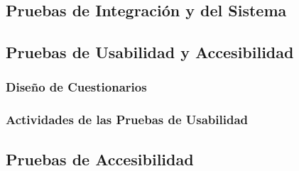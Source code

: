 \subsection{Pruebas de Integración y del Sistema} 

\subsection{Pruebas de Usabilidad y Accesibilidad} 

\subsubsection{Diseño de Cuestionarios} 

\subsubsection{Actividades de las Pruebas de Usabilidad} 


\subsection{Pruebas de Accesibilidad} 

